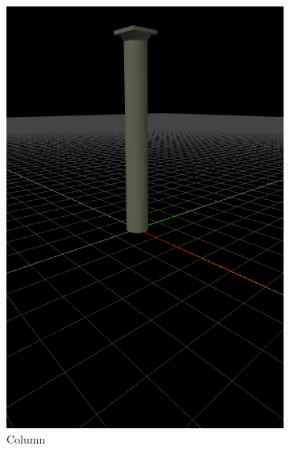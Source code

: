 \begin{figure}
\begin{subfigure}[b]{0.32\linewidth}
    \includegraphics[width=1.0\linewidth]{./images/all_examples/column_crop}
    \caption{Column}
    \label{fig:ex:column}
  \end{subfigure}
  \begin{subfigure}[b]{0.32\linewidth}

\end{subfigure}
\end{figure}
